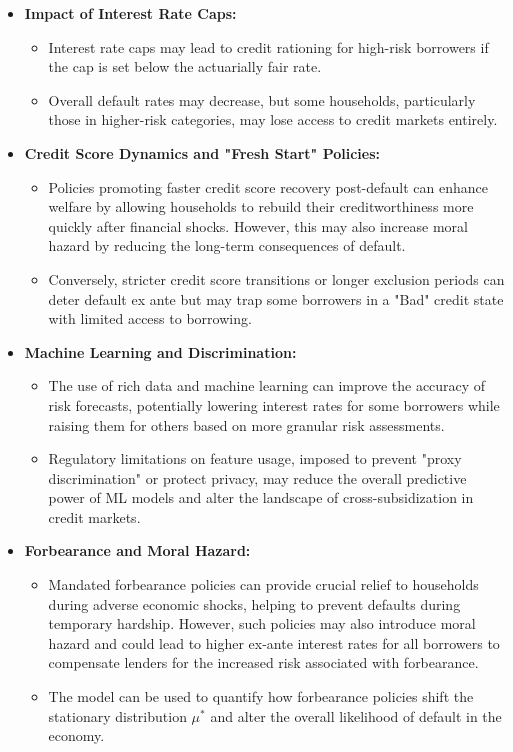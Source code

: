 \documentclass[acmsmall]{acmart}
\begin{document}
\begin{itemize}
    \item \textbf{Impact of Interest Rate Caps:}
    \begin{itemize}
        \item Interest rate caps may lead to credit rationing for high-risk borrowers if the cap is set below the actuarially fair rate.
        \item Overall default rates may decrease, but some households, particularly those in higher-risk categories, may lose access to credit markets entirely.
    \end{itemize}
    \item \textbf{Credit Score Dynamics and "Fresh Start" Policies:}
    \begin{itemize}
        \item Policies promoting faster credit score recovery post-default can enhance welfare by allowing households to rebuild their creditworthiness more quickly after financial shocks. However, this may also increase moral hazard by reducing the long-term consequences of default.
        \item Conversely, stricter credit score transitions or longer exclusion periods can deter default ex ante but may trap some borrowers in a "Bad" credit state with limited access to borrowing.
    \end{itemize}
    \item \textbf{Machine Learning and Discrimination:}
    \begin{itemize}
        \item The use of rich data and machine learning can improve the accuracy of risk forecasts, potentially lowering interest rates for some borrowers while raising them for others based on more granular risk assessments.
        \item Regulatory limitations on feature usage, imposed to prevent "proxy discrimination" or protect privacy, may reduce the overall predictive power of ML models and alter the landscape of cross-subsidization in credit markets.
    \end{itemize}
    \item \textbf{Forbearance and Moral Hazard:}
    \begin{itemize}
        \item Mandated forbearance policies can provide crucial relief to households during adverse economic shocks, helping to prevent defaults during temporary hardship. However, such policies may also introduce moral hazard and could lead to higher ex-ante interest rates for all borrowers to compensate lenders for the increased risk associated with forbearance.
        \item The model can be used to quantify how forbearance policies shift the stationary distribution $\mu^*$ and alter the overall likelihood of default in the economy.
    \end{itemize}
\end{itemize}
\end{document}
